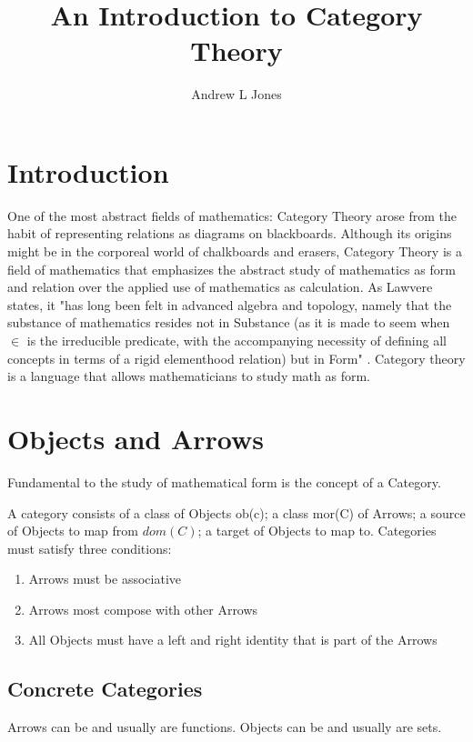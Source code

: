 \documentclass{article}
\title{An Introduction to Category Theory}
\author{Andrew L Jones}\date{}
\begin{document}
\maketitle



\section*{Introduction}
One of the most abstract fields of mathematics: Category Theory arose from the habit of representing relations as diagrams on blackboards. Although its origins might be in the corporeal world of chalkboards and erasers, Category Theory is a field of mathematics that emphasizes the abstract study of mathematics as form and relation over the applied use of mathematics as calculation. As Lawvere states, it "has long been felt in advanced algebra and topology, namely that the substance of mathematics resides not in Substance (as it is made to seem when $\in$ is the irreducible predicate, with the accompanying necessity of defining all concepts in terms of a rigid elementhood relation) but in Form" \cite{Lawvere01}. Category theory is a language that allows mathematicians to study math as form.


\section{Objects and Arrows}
Fundamental to the study of mathematical form is the concept of a Category.
\begin{definition}
A category consists of a class of Objects ob(c); a class mor(C) of Arrows; a source of Objects to map from $dom(C)$; a target of Objects to map to. Categories must satisfy three conditions: \begin{enumerate}
    \item Arrows must be associative
    \item Arrows most compose with other Arrows
    \item All Objects must have a left and right identity that is part of the Arrows
  \end{enumerate}
\end{definition}
\subsection{Concrete Categories}
Arrows can be and usually are functions. Objects can be and usually are sets.
\end{document}

